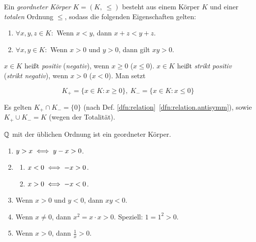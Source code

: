 \documentclass[12pt]{scrreprt}
\begin{document}
\begin{dfn}\label{dfn:geordn.koerper}
Ein \textit{geordneter Körper} $K = (K,\ \leq)$ besteht aus einem Körper $K$ und einer \textit{totalen} Ordnung $\leq$, sodass die folgenden Eigenschaften gelten:
\begin{enumerate} %
\item\label{dfn:geordn.koerper.01} $\forall x, y, z \in K:$ Wenn $x < y$, dann $x + z < y + z$.
\item\label{dfn:geordn.koerper.02} $\forall x, y \in K:$ Wenn $x > 0$ und $y > 0$, dann gilt $xy > 0$.
\end{enumerate}

$x \in K$ heißt \textit{positiv} (\textit{negativ}), wenn $x \geq 0$ ($x \leq 0$). $x \in K$ heißt \textit{strikt positiv} (\textit{strikt negativ}), wenn $x > 0$ ($x < 0$). Man setzt

\[K_+ = \{x \in K: x \geq 0\},\ K_- = \{x \in K: x \leq 0\}\]
\end{dfn}

\medskip\noindent\makebox[.25\textwidth]{\hrulefill}\medskip %

Es gelten $K_+ \cap K_- = \{0\}$ (nach Def. \ref{dfn:relation}~{\ref{dfn:relation.antisymm}}), sowie $K_+ \cup K_- = K$ (wegen der Totalität).

\begin{bsp*}
$\mathbb{Q}$ mit der üblichen Ordnung ist ein geordneter Körper.
\end{bsp*}

\begin{satz}\label{satz:geordn.koerper}
\begin{enumerate} %
\item $y > x \iff y - x > 0$.
\item\label{satz:geordn.koerp.b} \begin{enumerate}%
	\item $x < 0 \iff -x > 0$.
	\item $x > 0 \iff -x < 0$.
\end{enumerate}
\item Wenn $x > 0$ und  $y < 0$, dann $xy < 0$.
\item Wenn $x \neq 0$, dann $x^2 = x \cdot x > 0$. Speziell: $1 = 1^2 > 0$.
\item Wenn $x > 0$, dann $\displaystyle\frac{1}{x} > 0$.
\end{enumerate}
\end{satz}
\end{document}
